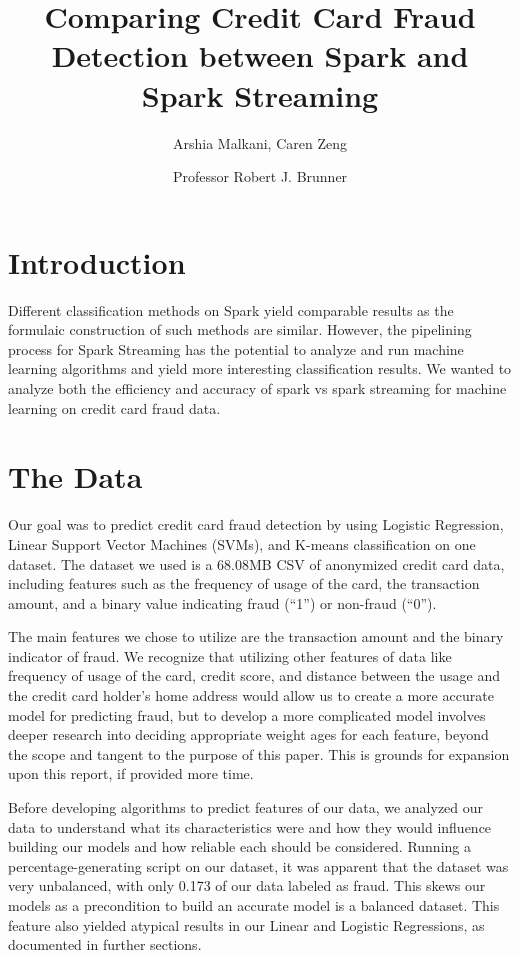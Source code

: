 \documentclass[9pt,twocolumn,twoside]{idsi}
\author[1]{Arshia Malkani, Caren Zeng}
\author[2]{Professor Robert J. Brunner}
\affil[1]{National Center For Supercomputing Applications (NCSA)}
\affil[2]{Laboratory for Computation, Data, and Machine Learning}
\title{Comparing Credit Card Fraud Detection between Spark and Spark Streaming}
\begin{document}

\maketitle

\section{Introduction}
Different classification methods on Spark yield comparable results as the formulaic construction of such methods are similar. However, the pipelining process for Spark Streaming has the potential to analyze and run machine learning algorithms and yield more interesting classification results. We wanted to analyze both the efficiency and accuracy of spark vs spark streaming for machine learning on credit card fraud data.  

\section{The Data}
Our goal was to predict credit card fraud detection by using Logistic Regression, Linear Support Vector Machines (SVMs), and K-means classification on one dataset. The dataset we used is a 68.08MB CSV of anonymized credit card data, including features such as the frequency of usage of the card, the transaction amount, and a binary value indicating fraud (“1”) or non-fraud (“0”).

The main features we chose to utilize are the transaction amount and the binary indicator of fraud. We recognize that utilizing other features of data like frequency of usage of the card, credit score, and distance between the usage and the credit card holder’s home address would allow us to create a more accurate model for predicting fraud, but to develop a more complicated model involves deeper research into deciding appropriate weight ages for each feature, beyond the scope and tangent to the purpose of this paper. This is grounds for expansion upon this report, if provided more time.

Before developing algorithms to predict features of our data, we analyzed our data to understand what its characteristics were and how they would influence building our models and how reliable each should be considered. Running a percentage-generating script on our dataset, it was apparent that the dataset was very unbalanced, with only 0.173 of our data labeled as fraud. This skews our models as a precondition to build an accurate model is a balanced dataset. This feature also yielded atypical results in our Linear and Logistic Regressions, as documented in further sections.  
\end{document}
